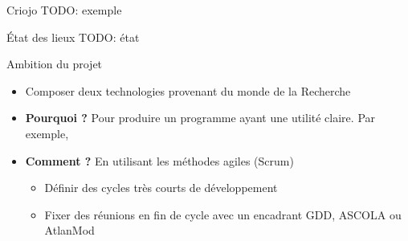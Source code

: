 \begin{frame}{Criojo}
TODO: exemple
\end{frame}

\begin{frame}{État des lieux}
TODO: état
\end{frame}

\begin{frame}{Ambition du projet}
\begin{itemize}
  \item Composer deux technologies provenant du monde de la Recherche
  \item \textbf{Pourquoi ?} Pour produire un programme ayant une utilité claire.
  Par exemple, 
  \item \textbf{Comment ?} En utilisant les méthodes agiles (Scrum)
    \begin{itemize}
    \item Définir des cycles très courts de développement
    \item Fixer des réunions en fin de cycle avec un encadrant GDD, ASCOLA ou
    AtlanMod
    \end{itemize}
\end{itemize}
\end{frame}

